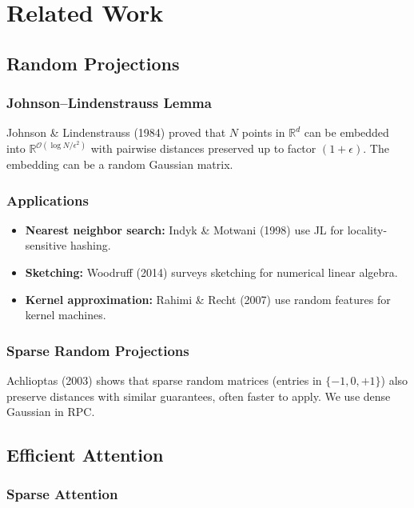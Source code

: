 
\section{Related Work}

\subsection{Random Projections}

\subsubsection{Johnson--Lindenstrauss Lemma}

Johnson \& Lindenstrauss (1984) proved that $N$ points in $\mathbb{R}^d$ can 
be embedded into $\mathbb{R}^{\mathcal{O}(\log N / \epsilon^2)}$ with 
pairwise distances preserved up to factor $(1 + \epsilon)$. The embedding 
can be a random Gaussian matrix.

\subsubsection{Applications}

\begin{itemize}
\item \textbf{Nearest neighbor search:} Indyk \& Motwani (1998) use JL for
  locality-sensitive hashing.
\item \textbf{Sketching:} Woodruff (2014) surveys sketching for numerical linear
  algebra.
\item \textbf{Kernel approximation:} Rahimi \& Recht (2007) use random features
  for kernel machines.

\end{itemize}
\subsubsection{Sparse Random Projections}

Achlioptas (2003) shows that sparse random matrices (entries in 
$\{-1, 0, +1\}$) also preserve distances with similar guarantees, 
often faster to apply. We use dense Gaussian in RPC.

\subsection{Efficient Attention}

\subsubsection{Sparse Attention}

